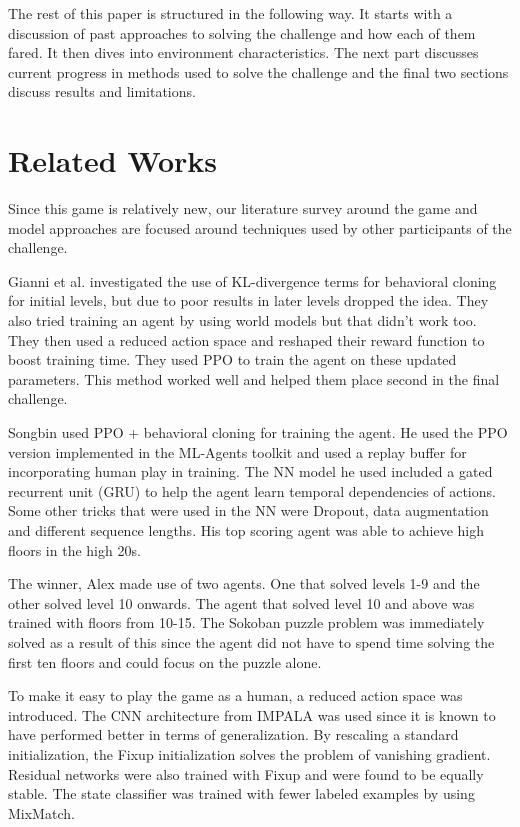 \documentclass[conference]{IEEEtran}
\begin{document}
The rest of this paper is structured in the following way. It starts with a discussion of past approaches to solving the challenge and how each of them fared. It then dives into environment characteristics. The next part discusses current progress in methods used to solve the challenge and the final two sections discuss results and limitations.

\section{Related Works}

Since this game is relatively new, our literature survey around the game and model approaches are focused around techniques used by other participants of the challenge.

Gianni et al. \cite{Unity-tech-blog} investigated the use of KL-divergence terms for behavioral cloning for initial levels, but due to poor results in later levels dropped the idea. They also tried training an agent by using world models but that didn't work too. They then used a reduced action space and reshaped their reward function to boost training time. They used PPO to train the agent on these updated parameters. This method worked well and helped them place second in the final challenge. 

Songbin \cite{Unity-tech-blog} used PPO + behavioral cloning for training the agent. He used the PPO version implemented in the ML-Agents toolkit and used a replay buffer for incorporating human play in training. The NN model he used included a gated recurrent unit (GRU) to help the agent learn temporal dependencies of actions. Some other tricks that were used in the NN were Dropout, data augmentation and different sequence lengths. His top scoring agent was able to achieve high floors in the high 20s. 

The winner, Alex \cite{Pickled-ml-blog} made use of two agents. One that solved levels 1-9 and the other solved level 10 onwards. The agent that solved level 10 and above was trained with floors from 10-15. The Sokoban puzzle problem was immediately solved as a result of this since the agent did not have to spend time solving the first ten floors and could focus on the puzzle alone.

To make it easy to play the game as a human, a reduced action space was introduced.  The CNN architecture from IMPALA was used since it is known to have performed better in terms of generalization. By rescaling a standard initialization, the Fixup initialization \cite{Zhang-et-al} solves the problem of vanishing gradient. Residual networks were also trained with Fixup and were found to be equally stable. The state classifier was trained with fewer labeled examples by using MixMatch. \cite{Berthelot}
\end{document}
